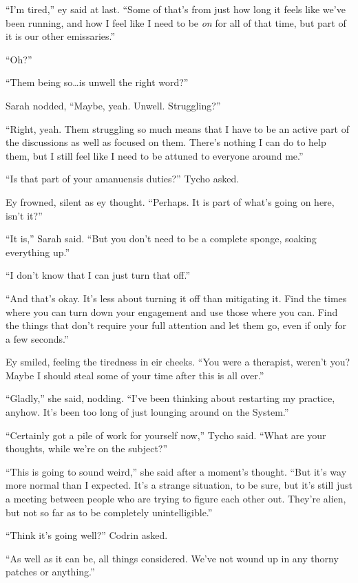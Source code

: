 ``I'm tired,'' ey said at last. ``Some of that's from just how long it feels like we've been running, and how I feel like I need to be \emph{on} for all of that time, but part of it is our other emissaries.''

``Oh?''

``Them being so\ldots is unwell the right word?''

Sarah nodded, ``Maybe, yeah. Unwell. Struggling?''

``Right, yeah. Them struggling so much means that I have to be an active part of the discussions as well as focused on them. There's nothing I can do to help them, but I still feel like I need to be attuned to everyone around me.''

``Is that part of your amanuensis duties?'' Tycho asked.

Ey frowned, silent as ey thought. ``Perhaps. It is part of what's going on here, isn't it?''

``It is,'' Sarah said. ``But you don't need to be a complete sponge, soaking everything up.''

``I don't know that I can just turn that off.''

``And that's okay. It's less about turning it off than mitigating it. Find the times where you can turn down your engagement and use those where you can. Find the things that don't require your full attention and let them go, even if only for a few seconds.''

Ey smiled, feeling the tiredness in eir cheeks. ``You were a therapist, weren't you? Maybe I should steal some of your time after this is all over.''

``Gladly,'' she said, nodding. ``I've been thinking about restarting my practice, anyhow. It's been too long of just lounging around on the System.''

``Certainly got a pile of work for yourself now,'' Tycho said. ``What are your thoughts, while we're on the subject?''

``This is going to sound weird,'' she said after a moment's thought. ``But it's way more normal than I expected. It's a strange situation, to be sure, but it's still just a meeting between people who are trying to figure each other out. They're alien, but not so far as to be completely unintelligible.''

``Think it's going well?'' Codrin asked.

``As well as it can be, all things considered. We've not wound up in any thorny patches or anything.''

